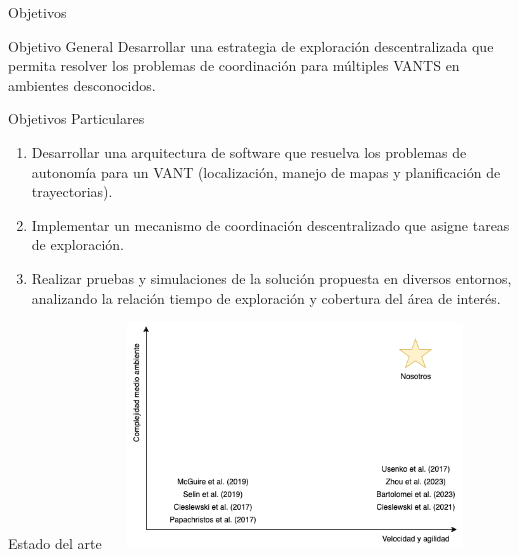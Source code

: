 \documentclass[24pt,aspectratio=169]{beamer}
\begin{document}
\begin{frame}{Objetivos}
  
  \begin{block}{Objetivo General}
    \vspace{2mm}
    Desarrollar una estrategia de exploración descentralizada que permita resolver los problemas de coordinación para múltiples VANTS en ambientes desconocidos.
  \end{block}
  \bigskip
  \begin{block}{Objetivos Particulares}
    \vspace{2mm}
    \begin{enumerate}
    \item Desarrollar una arquitectura de software que resuelva los problemas de autonomía para un VANT (localización, manejo de mapas y planificación de trayectorias).
    \item Implementar un mecanismo de coordinación descentralizado que asigne tareas de exploración.
    \item Realizar pruebas y simulaciones de la solución propuesta en diversos entornos, analizando la relación tiempo de exploración y cobertura del área de interés.
    \end{enumerate}
  \end{block}
\end{frame}

\begin{frame}{Estado del arte}
  \centering
  \includegraphics[width=10cm, height=6cm]{soa}
\end{frame}
\end{document}
